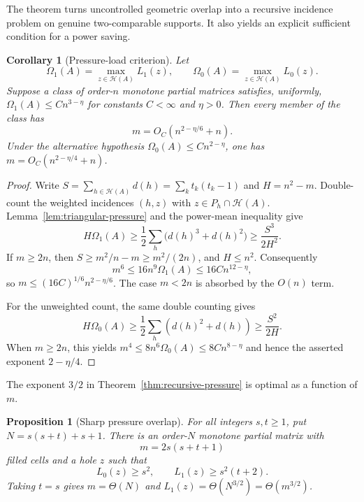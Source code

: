 \documentclass[11pt]{article}
\numberwithin{equation}{section}
\newtheorem{proposition}[theorem]{Proposition}
\newtheorem{corollary}[theorem]{Corollary}
\theoremstyle{definition}
\theoremstyle{remark}
\newcommand{\Hcal}{\mathcal H}
\begin{document}
The theorem turns uncontrolled geometric overlap into a recursive incidence
problem on genuine two-comparable supports.  It also yields an explicit
sufficient condition for a power saving.

\begin{corollary}[Pressure-load criterion]\label{cor:pressure-load}
Let
\[
 \Omega_1(A)=\max_{z\in\Hcal(A)}L_1(z),\qquad
 \Omega_0(A)=\max_{z\in\Hcal(A)}L_0(z).
\]
Suppose a class of order-$n$ monotone partial matrices satisfies, uniformly,
$\Omega_1(A)\le Cn^{3-\eta}$ for constants $C<\infty$ and $\eta>0$.  Then
every member of the class has
\begin{equation}\label{eq:pressure-power-saving}
 m=O_C(n^{2-\eta/6}+n).
\end{equation}
Under the alternative hypothesis $\Omega_0(A)\le Cn^{2-\eta}$, one has
$m=O_C(n^{2-\eta/4}+n)$.
\end{corollary}

\begin{proof}
Write $S=\sum_{h\in\Hcal(A)}d(h)=\sum_k t_k(t_k-1)$ and $H=n^2-m$.
Double-count the weighted incidences $(h,z)$ with
$z\in P_h\cap\Hcal(A)$.  Lemma~\ref{lem:triangular-pressure} and the
power-mean inequality give
\[
 H\Omega_1(A)
 \ge\frac12\sum_h\bigl(d(h)^3+d(h)^2\bigr)
 \ge\frac{S^3}{2H^2}.
\]
If $m\ge2n$, then
$S\ge m^2/n-m\ge m^2/(2n)$, and $H\le n^2$.  Consequently
\[
 m^6\le16n^9\Omega_1(A)\le16C n^{12-\eta},
\]
so $m\le(16C)^{1/6}n^{2-\eta/6}$.  The case $m<2n$ is absorbed by the
$O(n)$ term.

For the unweighted count, the same double counting gives
\[
 H\Omega_0(A)\ge\frac12\sum_h(d(h)^2+d(h))\ge\frac{S^2}{2H}.
\]
When $m\ge2n$, this yields
$m^4\le8n^6\Omega_0(A)\le8C n^{8-\eta}$ and hence the asserted exponent
$2-\eta/4$.
\end{proof}

The exponent $3/2$ in Theorem~\ref{thm:recursive-pressure} is optimal as a
function of $m$.

\begin{proposition}[Sharp pressure overlap]\label{prop:sharp-pressure}
For all integers $s,t\ge1$, put
$N=s(s+t)+s+1$.  There is an order-$N$ monotone partial matrix with
\[
 m=2s(s+t+1)
\]
filled cells and a hole $z$ such that
\[
 L_0(z)\ge s^2,\qquad L_1(z)\ge s^2(t+2).
\]
Taking $t=s$ gives $m=\Theta(N)$ and
$L_1(z)=\Theta(N^{3/2})=\Theta(m^{3/2})$.
\end{proposition}
\end{document}
